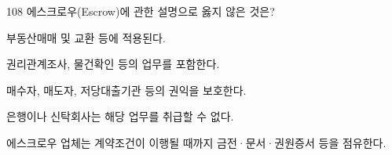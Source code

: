 \begin{question}{108}
에스크로우(Escrow)에 관한 설명으로 옳지 않은 것은?
\begin{choices}
  \item 부동산매매 및 교환 등에 적용된다.
  \item 권리관계조사, 물건확인 등의 업무를 포함한다.
  \item 매수자, 매도자, 저당대출기관 등의 권익을 보호한다.
  \item 은행이나 신탁회사는 해당 업무를 취급할 수 없다.
  \item 에스크로우 업체는 계약조건이 이행될 때까지 금전·문서·권원증서 등을 점유한다.
\end{choices}
\end{question}
